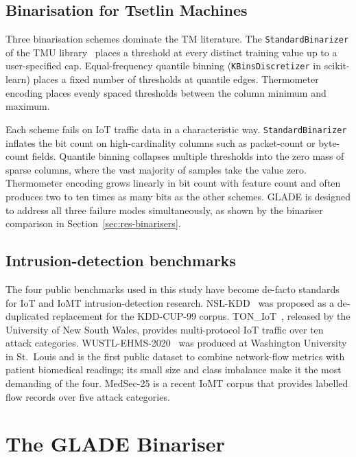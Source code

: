 \documentclass[journal,10pt]{IEEEtran}
\begin{document}
\subsection{Binarisation for Tsetlin Machines}
\label{sec:related-bin}
Three binarisation schemes dominate the TM literature. The
\texttt{StandardBinarizer} of the TMU library~\cite{cair2024tmu}
places a threshold at every distinct training value up to a
user-specified cap. Equal-frequency quantile binning
(\texttt{KBinsDiscretizer} in scikit-learn) places a fixed number of
thresholds at quantile edges. Thermometer encoding places evenly
spaced thresholds between the column minimum and maximum.

Each scheme fails on IoT traffic data in a characteristic way.
\texttt{StandardBinarizer} inflates the bit count on high-cardinality
columns such as packet-count or byte-count fields. Quantile binning
collapses multiple thresholds into the zero mass of sparse columns,
where the vast majority of samples take the value zero. Thermometer
encoding grows linearly in bit count with feature count and often
produces two to ten times as many bits as the other schemes.
GLADE is designed to address all three failure modes simultaneously,
as shown by the binariser comparison in
Section~\ref{sec:res-binarisers}.

\subsection{Intrusion-detection benchmarks}
\label{sec:related-data}
The four public benchmarks used in this study have become de-facto
standards for IoT and IoMT intrusion-detection research.
NSL-KDD~\cite{tavallaee2009nslkdd} was proposed as a de-duplicated
replacement for the KDD-CUP-99 corpus.
TON\_IoT~\cite{moustafa2021ton}, released by the University of New
South Wales, provides multi-protocol IoT traffic over ten attack
categories. WUSTL-EHMS-2020~\cite{hady2020wustl} was produced at
Washington University in St.~Louis and is the first public dataset to
combine network-flow metrics with patient biomedical readings; its
small size and class imbalance make it the most demanding of the
four. MedSec-25 is a recent IoMT corpus that provides labelled flow
records over five attack categories.

\section{The GLADE Binariser}
\label{sec:glade}
\end{document}

